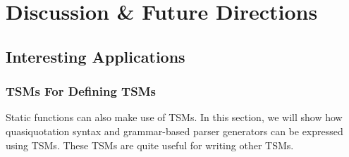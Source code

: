 \chapter{Discussion \& Future Directions}\label{chap:conclusion}
\section{Interesting Applications}
\subsection{TSMs For Defining TSMs}\label{sec:tsms-for-tsms}
Static functions can also make use of TSMs. In this section, we will show how quasiquotation syntax and grammar-based parser generators can be expressed using TSMs. These TSMs are quite useful for writing other TSMs.
